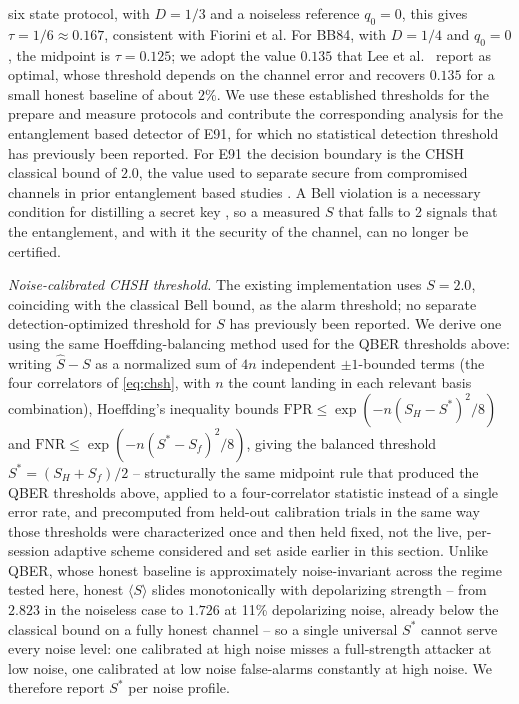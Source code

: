 \documentclass[conference]{IEEEtran}
\begin{document}
six state protocol, with $D = 1/3$ and a noiseless reference $q_0 = 0$, this gives
$\tau = 1/6 \approx 0.167$, consistent with Fiorini et al. For BB84, with $D = 1/4$
and $q_0 = 0$, the midpoint is $\tau = 0.125$; we adopt the value $0.135$ that Lee
et al.\ \cite{lee2022eavesdropping} report as optimal, whose threshold depends on
the channel error and recovers $0.135$ for a small honest baseline of about $2\%$. We use these
established thresholds for the prepare and measure protocols and contribute the
corresponding analysis for the entanglement based detector of E91, for which no
statistical detection threshold has previously been reported. For E91 the
decision boundary is the CHSH classical bound of $2.0$, the value used to
separate secure from compromised channels in prior entanglement based studies
\cite{ekert1991quantum, dhakal2025performance, kadir2025e91}. A Bell violation is
a necessary condition for distilling a secret key \cite{singh2021role}, so a
measured $S$ that falls to 2 signals that the entanglement, and with it the
security of the channel, can no longer be certified.

\textit{Noise-calibrated CHSH threshold.} The existing implementation uses $S=2.0$, coinciding with the classical Bell bound, as the alarm threshold; no separate detection-optimized threshold for $S$ has previously been reported. We derive one using the same Hoeffding-balancing method used for the QBER thresholds above: writing $\hat S - S$ as a normalized sum of $4n$ independent $\pm1$-bounded terms (the four correlators of \eqref{eq:chsh}, with $n$ the count landing in each relevant basis combination), Hoeffding's inequality bounds $\mathrm{FPR}\le\exp(-n(S_H-S^*)^2/8)$ and $\mathrm{FNR}\le\exp(-n(S^*-S_f)^2/8)$, giving the balanced threshold $S^*=(S_H+S_f)/2$ -- structurally the same midpoint rule that produced the QBER thresholds above, applied to a four-correlator statistic instead of a single error rate, and precomputed from held-out calibration trials in the same way those thresholds were characterized once and then held fixed, not the live, per-session adaptive scheme considered and set aside earlier in this section. Unlike QBER, whose honest baseline is approximately noise-invariant across the regime tested here, honest $\langle S\rangle$ slides monotonically with depolarizing strength -- from $2.823$ in the noiseless case to $1.726$ at 11\% depolarizing noise, already below the classical bound on a fully honest channel -- so a single universal $S^*$ cannot serve every noise level: one calibrated at high noise misses a full-strength attacker at low noise, one calibrated at low noise false-alarms constantly at high noise. We therefore report $S^*$ per noise profile.
\end{document}
